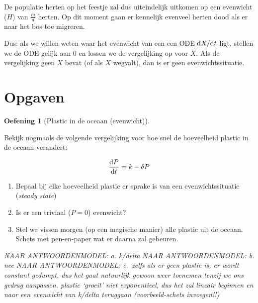\documentclass[
  a4paper,
]{scrbook}
\providecommand{\tightlist}{%
  \setlength{\itemsep}{0pt}\setlength{\parskip}{0pt}}\usepackage{longtable,booktabs,array}
\theoremstyle{definition}
\newtheorem{exercise}{Oefening}[chapter]
\theoremstyle{remark}
\begin{document}
De populatie herten op het feestje zal dus uiteindelijk uitkomen op een
evenwicht (\(H\)) van \(\frac{m}{d}\) herten. Op dit moment gaan er
kennelijk evenveel herten dood als er naar het bos toe migreren.

Dus: als we willen weten waar het evenwicht van een een ODE
\(\mathchoice{\frac{\mathrm{d}X}
{\mathrm{d}t}}{\mathrm{d}X/\mathrm{d}t}
{\mathrm{d}X/\mathrm{d}t}
{\mathrm{d}X/\mathrm{d}t}\) ligt, stellen we de ODE gelijk aan \(0\) en
lossen we de vergelijking op voor \(X\). Als de vergelijking geen \(X\)
bevat (of als \(X\) wegvalt), dan is er geen evenwichtssituatie.

\hypertarget{opgaven-1}{%
\section{Opgaven}\label{opgaven-1}}

\begin{exercise}[Plastic in de oceaan
(evenwicht)]\protect\hypertarget{exr-eenheden-tussen2}{}\label{exr-eenheden-tussen2}

Bekijk nogmaals de volgende vergelijking voor hoe snel de hoeveelheid
plastic in de oceaan verandert:

\begin{align}
\mathchoice{\frac{\mathrm{d}P}
{\mathrm{d}t}}{\mathrm{d}P/\mathrm{d}t}
{\mathrm{d}P/\mathrm{d}t}
{\mathrm{d}P/\mathrm{d}t} = k - \delta P
\end{align}

\begin{enumerate}
\def\labelenumi{\alph{enumi}.}
\tightlist
\item
  Bepaal bij elke hoeveelheid plastic er sprake is van een
  evenwichtssituatie (\emph{steady state})
\item
  Is er een triviaal (\(P=0\)) evenwicht?
\item
  Stel we vissen morgen (op een magische manier) alle plastic uit de
  oceaan. Schets met pen-en-paper wat er daarna zal gebeuren.
\end{enumerate}

\emph{NAAR ANTWOORDENMODEL: a. k/delta} \emph{NAAR ANTWOORDENMODEL: b.
nee} \emph{NAAR ANTWOORDENMODEL: c.~zelfs als er geen plastic is, er
wordt constant gedumpt, dus het gaat natuurlijk gewoon weer toenemen
tenzij we ons gedrag aanpassen. plastic `groeit' niet exponentieel, dus
het zal lineair beginnen en naar een evenwicht van k/delta teruggaan
(voorbeeld-schets invoegen!!)}

\end{exercise}
\end{document}
